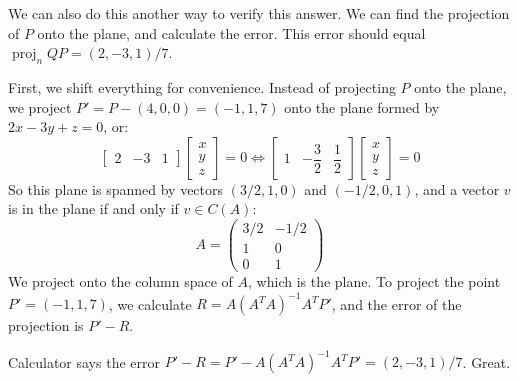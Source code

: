 \documentclass[preview, margin=0.6in]{standalone}
\DeclareMathOperator{\proj}{proj}
\begin{document}
\begin{mdframed}
	We can also do this another way to verify this answer. We can find the projection of $P$ onto the plane, and calculate the error. This error should equal $\proj_nQP=(2,-3,1)/7$.

	First, we shift everything for convenience. Instead of projecting $P$ onto the plane, we project $P'=P-(4,0,0)=(-1,1,7)$ onto the plane formed by $2x-3y+z=0$, or:
	\begin{equation*}
	    \begin{bmatrix}
			2 & -3 & 1
	    \end{bmatrix}
		\begin{bmatrix}
			x \\ y \\ z
		\end{bmatrix}
		=0
		\iff 
	    \begin{bmatrix}
			1 & -\dfrac32 & \dfrac12
	    \end{bmatrix}
		\begin{bmatrix}
			x \\ y \\ z
		\end{bmatrix}
		=0
	\end{equation*}
	So this plane is spanned by vectors $(3/2,1,0)$ and $(-1/2,0,1)$, and a vector $v$ is in the plane if and only if $v\in C(A)$:
	\begin{equation*}
		A=\begin{pmatrix}
			3/2 & -1/2 \\
			1 & 0 \\ 
			0 & 1
		\end{pmatrix}
	\end{equation*}
	We project onto the column space of $A$, which is the plane. To project the point $P'=(-1,1,7)$, we calculate $R=A(A^TA)^{-1}A^TP'$, and the error of the projection is $P'-R$.

	Calculator says the error $P'-R=P'-A(A^TA)^{-1}A^TP'=(2,-3,1)/7$. Great.
\end{mdframed}
\end{document}
